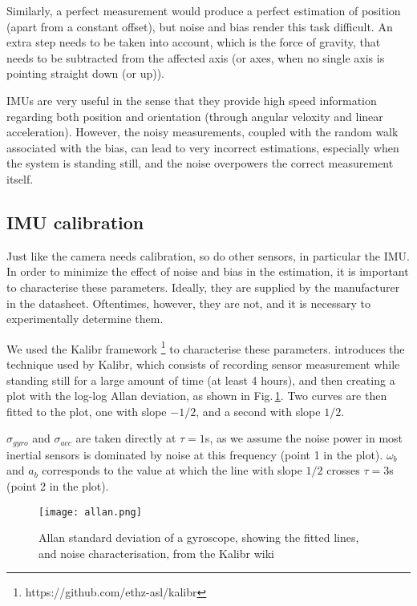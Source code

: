 Similarly, a perfect measurement would produce a perfect estimation of position (apart from a constant offset), but noise and bias render this task difficult. An extra step needs to be taken into account, which is the force of gravity, that needs to be subtracted from the affected axis (or axes, when no single axis is pointing straight down (or up)).

IMUs are very useful in the sense that they provide high speed information regarding both position and orientation (through angular veloxity and linear acceleration). However, the noisy measurements, coupled with the random walk associated with the bias, can lead to very incorrect estimations, especially when the system is standing still, and the noise overpowers the correct measurement itself.

\subsection{IMU calibration}

Just like the camera needs calibration, so do other sensors, in particular the IMU. In order to minimize the effect of noise and bias in the estimation, it is important to characterise these parameters. Ideally, they are supplied by the manufacturer in the datasheet. Oftentimes, however, they are not, and it is necessary to experimentally determine them.

We used the Kalibr framework \footnote{https://github.com/ethz-asl/kalibr} to characterise these parameters. \cite{board1998ieee} introduces the technique used by Kalibr, which consists of recording sensor measurement while standing still for a large amount of time (at least 4 hours), and then creating a plot with the log-log Allan deviation, as shown in Fig.\,\ref{fig:sec2_allan}. Two curves are then fitted to the plot, one with slope $-1/2$, and a second with slope $1/2$.

$\sigma_{gyro}$ and $\sigma_{acc}$ are taken directly at $\tau = 1$s, as we assume the noise power in most inertial sensors is dominated by noise at this frequency (point 1 in the plot). $\omega_b$ and $a_b$ corresponds to the value at which the line with slope $1/2$ crosses $\tau = 3$s (point 2 in the plot).

\begin{figure}[ht]
    \centering
    \texttt{[image: allan.png]}
    \caption[Calibration of IMU through Allan standard deviation fitting]{Allan standard deviation of a gyroscope, showing the fitted lines, and noise characterisation, from the Kalibr wiki}
    \label{fig:sec2_allan}
\end{figure}
